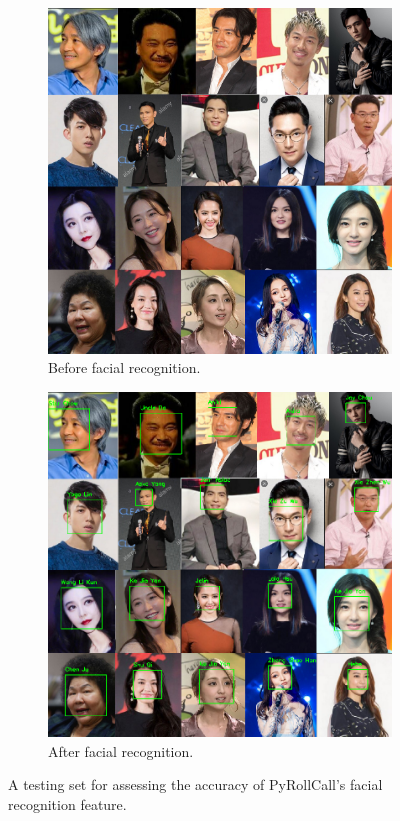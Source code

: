 \begin{figure}[!htb]
  \centering
  \begin{subfigure}[b]{0.48\linewidth}
    \includegraphics[width=\linewidth]{figures/testing-set.png}
    \caption{Before facial recognition.}
  \end{subfigure}
  \hfill
  \begin{subfigure}[b]{0.48\linewidth}
    \includegraphics[width=\linewidth]{figures/testing-set-result.png}
    \caption{After facial recognition.}
  \end{subfigure}
  \caption{A testing set for assessing the accuracy of PyRollCall's facial recognition feature.}
  \label{fig:testing-set}
\end{figure}
\vspace{0.5cm}
